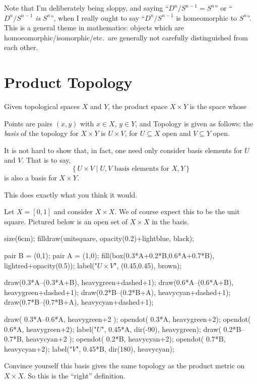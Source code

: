 \documentclass[11pt]{scrreprt}
\begin{document}
\begin{abuse}
	Note that I'm deliberately being sloppy, and saying
	``$D^n / S^{n-1} = S^n$'' or ``$D^n / S^{n-1}$ \emph{is} $S^n$'',
	when I really ought to say ``$D^n / S^{n-1}$ is homeomorphic to $S^n$''.
	This is a general theme in mathematics:
	objects which are homoeomorphic/isomorphic/etc.\ are generally
	not carefully distinguished from each other.
\end{abuse}

\section{Product Topology}

\begin{definition}
	Given topological spaces $X$ and $Y$,
	the product space $X \times Y$ is the space whose
	\begin{itemize}
		\ii Points are pairs $(x,y)$ with $x \in X$, $y \in Y$, and
		\ii Topology is given as follows: the \emph{basis} of
		the topology for $X \times Y$ is $U \times V$,
		for $U \subseteq X$ open and $V \subseteq Y$ open.
	\end{itemize}
\end{definition}
\begin{remark}
	It is not hard to show that, in fact,
	one need only consider basis elements for $U$ and $V$.
	That is to say,
	\[ \left\{ U \times V \mid
		U,V \text{ basis elements for } X,Y \right\} \]
	is also a basis for $X \times Y$.
\end{remark}

This does exactly what you think it would.
\begin{example}
	Let $X = [0,1]$ and consider $X \times X$.
	We of course expect this to be the unit square.
	Pictured below is an open set of $X \times X$ in the basis.
	\begin{center}
		\begin{asy}
		size(6cm);
		filldraw(unitsquare, opacity(0.2)+lightblue, black);

		pair B = (0,1);
		pair A = (1,0);
		fill(box(0.3*A+0.2*B,0.6*A+0.7*B), lightred+opacity(0.5));
		label("$U \times V$", (0.45,0.45), brown);

		draw(0.3*A--(0.3*A+B), heavygreen+dashed+1);
		draw(0.6*A--(0.6*A+B), heavygreen+dashed+1);
		draw(0.2*B--(0.2*B+A), heavycyan+dashed+1);
		draw(0.7*B--(0.7*B+A), heavycyan+dashed+1);

		draw( 0.3*A--0.6*A, heavygreen+2 );
		opendot( 0.3*A,  heavygreen+2);
		opendot( 0.6*A, heavygreen+2);
		label("$U$", 0.45*A, dir(-90), heavygreen);
		draw( 0.2*B--0.7*B, heavycyan+2 );
		opendot( 0.2*B, heavycyan+2);
		opendot( 0.7*B, heavycyan+2);
		label("$V$", 0.45*B, dir(180), heavycyan);
		\end{asy}
	\end{center}
\end{example}
\begin{exercise}
	Convince yourself this basis gives the same topology
	as the product metric on $X \times X$.
	So this is the ``right'' definition.
\end{exercise}
\end{document}
